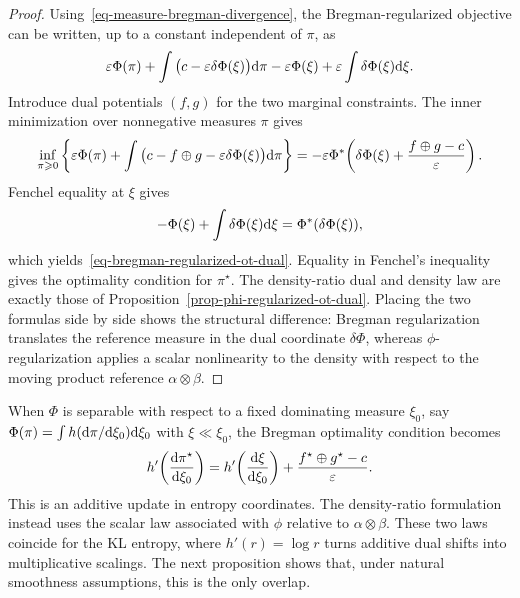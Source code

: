 \begin{proof}
	Using~\eqref{eq-measure-bregman-divergence}, the Bregman-regularized objective can be written, up to a constant independent of $\pi$, as
	\[
		\varepsilon\Phi(\pi)
		+
		\int\big(c-\varepsilon\delta\Phi(\xi)\big)\mathrm{d}\pi
		-\varepsilon\Phi(\xi)+\varepsilon\int\delta\Phi(\xi)\mathrm{d}\xi .
	\]
	Introduce dual potentials $(f,g)$ for the two marginal constraints. The inner minimization over nonnegative measures $\pi$ gives
	\[
		\inf_{\pi\geqslant0}
		\left\{
			\varepsilon\Phi(\pi)
			+
			\int
			\big(c-f\oplus g-\varepsilon\delta\Phi(\xi)\big)
			\mathrm{d}\pi
		\right\}
		=
		-\varepsilon
		\Phi^*\!\left(
			\delta\Phi(\xi)+\frac{f\oplus g-c}{\varepsilon}
		\right).
	\]
	Fenchel equality at $\xi$ gives
	\[
		-\Phi(\xi)+\int\delta\Phi(\xi)\mathrm{d}\xi
		=
		\Phi^*(\delta\Phi(\xi)),
	\]
	which yields~\eqref{eq-bregman-regularized-ot-dual}. Equality in Fenchel's inequality gives the optimality condition for $\pi^\star$. The density-ratio dual and density law are exactly those of Proposition~\ref{prop-phi-regularized-ot-dual}. Placing the two formulas side by side shows the structural difference: Bregman regularization translates the reference measure in the dual coordinate $\delta\Phi$, whereas $\phi$-regularization applies a scalar nonlinearity to the density with respect to the moving product reference $\alpha\otimes\beta$.
\end{proof}

When $\Phi$ is separable with respect to a fixed dominating measure $\xi_0$, say $\Phi(\pi)=\int h(\mathrm{d}\pi/\mathrm{d}\xi_0)\mathrm{d}\xi_0$ with $\xi\ll\xi_0$, the Bregman optimality condition becomes
\[
	h'\!\left(\frac{\mathrm{d}\pi^\star}{\mathrm{d}\xi_0}\right)
	=
	h'\!\left(\frac{\mathrm{d}\xi}{\mathrm{d}\xi_0}\right)
	+
	\frac{f^\star\oplus g^\star-c}{\varepsilon}.
\]
This is an additive update in entropy coordinates. The density-ratio formulation instead uses the scalar law associated with $\phi$ relative to $\alpha\otimes\beta$. These two laws coincide for the KL entropy, where $h'(r)=\log r$ turns additive dual shifts into multiplicative scalings. The next proposition shows that, under natural smoothness assumptions, this is the only overlap.


